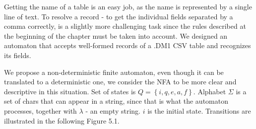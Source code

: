 Getting the name of a table is an easy job, as the name is represented by a single line of text. 
To resolve a record - to get the individual fields separated by a comma correctly, is a slightly more challenging task since the rules described at the beginning of the chapter must be taken into account.
We designed an automaton that accepts well-formed records of a .DM1 CSV table and recognizes its fields.

We propose a non-deterministic finite automaton, even though it can be translated to a deterministic one, we consider the NFA to be more clear and descriptive in this situation.
Set of states is $Q = \left\{i, q, e, a, f\right\}$.
Alphabet $\Sigma$ is a set of chars that can appear in a string, since that is what the automaton processes, together with $\lambda$ - an empty string.
$i$ is the initial state.
Transitions are illustrated in the following Figure 5.1.

